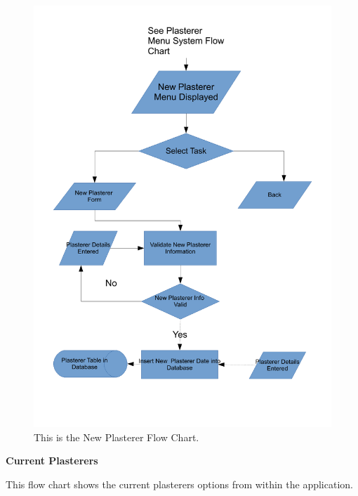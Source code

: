 \begin{figure}[H]
\includegraphics[scale=0.5]{./Design/images/FlowChartNewPlasterer.pdf}
    \caption{This is the New Plasterer Flow Chart.} 
\label{fig:FlowChartNewPlasterer}
\end{figure}


\pagebreak
\textbf{Current Plasterers}
\begin{flushleft}
This flow chart shows the current plasterers options from within the application.
\end{flushleft}

